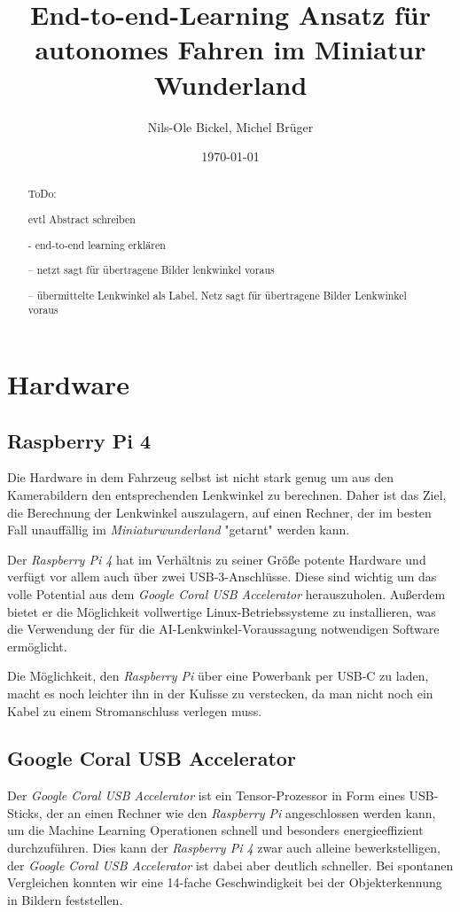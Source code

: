 \documentclass[a4paper, 12pt]{scrartcl}
\title{End-to-end-Learning Ansatz für autonomes Fahren im Miniatur Wunderland}
\author{Nils-Ole Bickel, Michel Brüger}
\date{\today}
\begin{document}
	
\maketitle
	
\tableofcontents

\newpage
	
	\begin{abstract}
ToDo: 

evtl Abstract schreiben	

- end-to-end learning erklären

-- netzt sagt für übertragene Bilder lenkwinkel voraus

-- übermittelte Lenkwinkel als Label, Netz sagt für übertragene Bilder Lenkwinkel voraus
	\end{abstract}

	\section{Hardware}
		\subsection{Raspberry Pi 4}
		Die Hardware in dem Fahrzeug selbst ist nicht stark genug um aus den Kamerabildern den entsprechenden Lenkwinkel zu berechnen. Daher ist das Ziel, die Berechnung der Lenkwinkel auszulagern, auf einen Rechner, der im besten Fall unauffällig im \emph{Miniaturwunderland} "getarnt" werden kann. 
		
		Der \emph{Raspberry Pi 4} hat im Verhältnis zu seiner Größe potente Hardware und verfügt vor allem auch über zwei USB-3-Anschlüsse. Diese sind wichtig um das volle Potential aus dem \emph{Google Coral USB Accelerator} herauszuholen. Außerdem bietet er die Möglichkeit vollwertige Linux-Betriebssysteme zu installieren, was die Verwendung der für die AI-Lenkwinkel-Voraussagung notwendigen Software ermöglicht.
		
		Die Möglichkeit, den \emph{Raspberry Pi} über eine Powerbank per USB-C zu laden, macht es noch leichter ihn in der Kulisse zu verstecken, da man nicht noch ein Kabel zu einem Stromanschluss verlegen muss.
		
		
		\subsection{Google Coral USB Accelerator}
		Der \emph{Google Coral USB Accelerator} ist ein Tensor-Prozessor in Form eines USB-Sticks, der an einen Rechner wie den \emph{Raspberry Pi} angeschlossen werden kann, um die Machine Learning Operationen schnell und besonders energieeffizient durchzuführen. Dies kann der \emph{Raspberry Pi 4} zwar auch alleine bewerkstelligen, der \emph{Google Coral USB Accelerator} ist dabei aber deutlich schneller. Bei spontanen Vergleichen konnten wir eine 14-fache Geschwindigkeit bei der Objekterkennung in Bildern feststellen.
		
\end{document}
